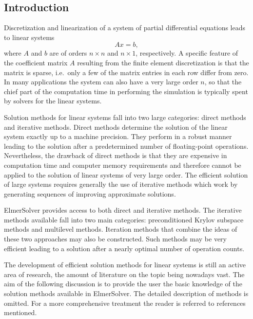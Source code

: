 \noindent

\begin{versiona}

\section{Introduction}

Discretization and linearization of a system of partial differential equations 
leads to linear systems 
\begin{equation}\label{ModelLinearSystem}
Ax = b,
\end{equation}
where $A$ and $b$ are of orders $n \times n$ and $n \times 1$, respectively. 
A specific feature of the coefficient matrix $A$ resulting from the finite element discretization
is that the matrix is sparse, 
i.e.\ only a few of the matrix entries in each row differ from zero.
In many applications the system can also have a very large order $n$, so that the 
chief part of the computation time in performing the simulation is typically spent 
by solvers for the linear systems. 

Solution methods for linear systems fall into two large categories: direct methods
and iterative methods. Direct methods determine the solution of the linear system 
exactly up to a machine precision. They perform in a robust manner leading to the
solution after a predetermined number of floating-point operations. Nevertheless,
the drawback of direct methods is that they are expensive 
in computation time and computer memory requirements and therefore cannot be applied
to the solution of linear systems of very large order. The efficient solution of large 
systems requires generally the use of iterative methods which work by generating sequences
of improving approximate solutions. 

ElmerSolver provides access to both direct and iterative methods.
The iterative methods available fall into two main categories: preconditioned
Krylov subspace methods and multilevel methods. Iteration methods that
combine the ideas of these two approaches may also be constructed. 
Such methods may be very efficient leading to a solution after a nearly
optimal number of operation counts.               

The development of efficient solution methods for linear systems is still an active area 
of research, the amount of literature on the topic being nowadays vast.   
The aim of the following discussion is to provide the user the basic knowledge of 
the solution methods available in ElmerSolver.
The detailed description of methods
is omitted. For a more comprehensive treatment the reader is referred to references
mentioned.    


\end{versiona}
